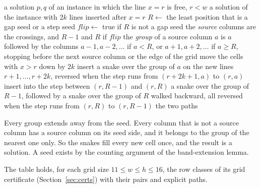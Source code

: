 \documentclass[11pt]{article}
\begin{document}
\begin{algorithm}[H]
\caption{MiddleSplice$(p,q,r,k)$, a middle block of $2k$ lines after the free line $x=r$}\label{alg:mid}
\begin{algorithmic}[1]
\Require a solution $p,q$ of an instance in which the line $x=r$ is free, $r<w$
\Ensure a solution of the instance with $2k$ lines inserted after $x=r$
\State $R \gets$ the least position that is a gap seed or a step seed
\State $\mathit{flip} \gets$ true if $R$ is not a gap seed
\State the \emph{source} columns are the crossings, and $R-1$ and $R$ if $\mathit{flip}$
\State the \emph{group} of a source column $a$ is $a$ followed by the columns $a-1,a-2,\ldots$ if
  $a<R$, or $a+1,a+2,\ldots$ if $a\ge R$, stopping before the next source column or the edge of
  the grid
\State move the cells with $x>r$ down by $2k$
  \State insert a snake over the group of $a$ on the new lines $r+1,\ldots,r+2k$, reversed when
    the step runs from $(r+2k+1,a)$ to $(r,a)$
\EndFor
{}
  \State insert into the step between $(r,R-1)$ and $(r,R)$ a snake over the group of $R-1$,
    followed by a snake over the group of $R$ walked backward, all reversed when the step runs from
    $(r,R)$ to $(r,R-1)$
\EndIf
\State \Return the two paths
\end{algorithmic}
\end{algorithm}

Every group extends away from the seed. Every column that is not a source column has a source
column on its seed side, and it belongs to the group of the nearest one only. So the snakes fill
every new cell once, and the result is a solution. A seed exists by the counting argument of the
band-extension lemma.

The table holds, for each grid size $11\le w\le h\le 16$, the row classes of its grid certificate
(Section~\ref{sec:certs}) with their pairs and explicit paths.
\end{document}
